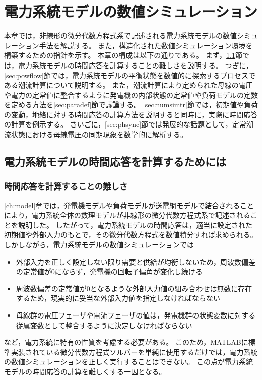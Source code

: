 \documentclass[tombow,dvipdfmx]{corona-a5-1.1}
\begin{document}
\chapter{電力系統モデルの数値シミュレーション}\label{chap:numcal}

本章では，非線形の微分代数方程式系で記述される電力系統モデルの数値シミュレーション手法を解説する。
また，構造化された数値シミュレーション環境を構築するための指針を示す。
本章の構成は以下の通りである。
まず，\ref{sec:howtocal}節では，電力系統モデルの時間応答を計算することの難しさを説明する。
つぎに，\ref{sec:powflow}節では，電力系統モデルの平衡状態を数値的に探索するプロセスである潮流計算について説明する。
また，潮流計算により定められた母線の電圧や電力の定常値に整合するように発電機の内部状態の定常値や負荷モデルの定数を定める方法を\ref{sec:paradef}節で議論する。
\ref{sec:numsimtr}節では，初期値や負荷の変動，地絡に対する時間応答の計算方法を説明すると同時に，実際に時間応答の計算を例示する。
さいごに，\ref{sec:phsync}節では発展的な話題として，定常潮流状態における母線電圧の同期現象を数学的に解析する。

\section{電力系統モデルの時間応答を計算するためには}\label{sec:howtocal}

\subsection{時間応答を計算することの難しさ}

\ref{ch:model}章では，発電機モデルや負荷モデルが送電網モデルで結合されることにより，電力系統全体の数理モデルが非線形の微分代数方程式系で記述されることを説明した。
したがって，電力系統モデルの時間応答は，適当に設定された初期値や外部入力のもとで，その微分代数方程式を数値積分すれば求められる。
しかしながら，電力系統モデルの数値シミュレーションでは
\begin{itemize}
\item 外部入力を正しく設定しない限り需要と供給が均衡しないため，周波数偏差の定常値が0にならず，発電機の回転子偏角が変化し続ける
\item 周波数偏差の定常値が0となるような外部入力値の組み合わせは無数に存在するため，現実的に妥当な外部入力値を指定しなければならない
\item 母線群の電圧フェーザや電流フェーザの値は，発電機群の状態変数に対する従属変数として整合するように決定しなければならない
\end{itemize}
など，電力系統に特有の性質を考慮する必要がある。
このため，MATLABに標準実装されている微分代数方程式ソルバーを単純に使用するだけでは，電力系統の数値シミュレーションを正しく実行することはできない。
この点が電力系統モデルの時間応答の計算を難しくする一因となる。
\end{document}
